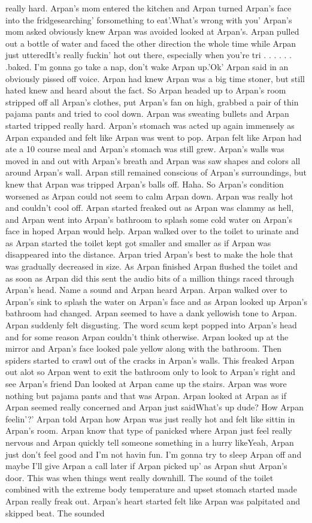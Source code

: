 \documentclass[12pt]{book}
\begin{document}
really hard. Arpan's mom entered the kitchen and Arpan turned Arpan's face into the fridgesearching' forsomething to eat'.What's wrong with you' Arpan's mom asked obviously knew Arpan was avoided looked at Arpan's. Arpan pulled out a bottle of water and faced the other direction the whole time while Arpan just utteredIt's really fuckin' hot out there, especially when you're tri . . .   . . .  .baked. I'm gonna go take a nap, don't wake Arpan up.'Ok' Arpan said in an obviously pissed off voice. Arpan had knew Arpan was a big time stoner, but still hated knew and heard about the fact. So Arpan headed up to Arpan's room stripped off all Arpan's clothes, put Arpan's fan on high, grabbed a pair of thin pajama pants and tried to cool down. Arpan was sweating bullets and Arpan started tripped really hard. Arpan's stomach was acted up again immensely as Arpan expanded and felt like Arpan was went to pop. Arpan felt like Arpan had ate a 10 course meal and Arpan's stomach was still grew. Arpan's walls was moved in and out with Arpan's breath and Arpan was saw shapes and colors all around Arpan's wall. Arpan still remained conscious of Arpan's surroundings, but knew that Arpan was tripped Arpan's balls off. Haha. So Arpan's condition worsened as Arpan could not seem to calm Arpan down. Arpan was really hot and couldn't cool off. Arpan started freaked out as Arpan was clammy as hell, and Arpan went into Arpan's bathroom to splash some cold water on Arpan's face in hoped Arpan would help. Arpan walked over to the toilet to urinate and as Arpan started the toilet kept got smaller and smaller as if Arpan was disappeared into the distance. Arpan tried Arpan's best to make the hole that was gradually decreased in size. As Arpan finished Arpan flushed the toilet and as soon as Arpan did this sent the audio bits of a million things raced through Arpan's head. Name a sound and Arpan heard Arpan. Arpan walked over to Arpan's sink to splash the water on Arpan's face and as Arpan looked up Arpan's bathroom had changed. Arpan seemed to have a dank yellowish tone to Arpan. Arpan suddenly felt disgusting. The word scum kept popped into Arpan's head and for some reason Arpan couldn't think otherwise. Arpan looked up at the mirror and Arpan's face looked pale yellow along with the bathroom. Then spiders started to crawl out of the cracks in Arpan's walls. This freaked Arpan out alot so Arpan went to exit the bathroom only to look to Arpan's right and see Arpan's friend Dan looked at Arpan came up the stairs. Arpan was wore nothing but pajama pants and that was Arpan. Arpan looked at Arpan as if Arpan seemed really concerned and Arpan just saidWhat's up dude? How Arpan feelin'?' Arpan told Arpan how Arpan was just really hot and felt like sittin in Arpan's room. Arpan know that type of panicked where Arpan just feel really nervous and Arpan quickly tell someone something in a hurry likeYeah, Arpan just don't feel good and I'm not havin fun. I'm gonna try to sleep Arpan off and maybe I'll give Arpan a call later if Arpan picked up' as Arpan shut Arpan's door. This was when things went really downhill. The sound of the toilet combined with the extreme body temperature and upset stomach started made Arpan really freak out. Arpan's heart started felt like Arpan was palpitated and skipped beat. The sounded 
\end{document}
